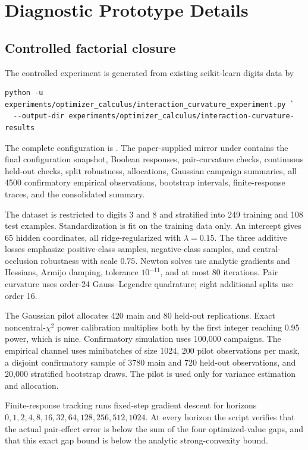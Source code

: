 \section{Diagnostic Prototype Details}
\label{app:diagnostic-details}

\subsection{Controlled factorial closure}

The controlled experiment is generated from existing scikit-learn digits data
by
\begin{verbatim}
python -u experiments/optimizer_calculus/interaction_curvature_experiment.py `
  --output-dir experiments/optimizer_calculus/interaction-curvature-results
\end{verbatim}
The complete configuration is
.
The paper-supplied mirror under  contains
the final configuration snapshot, Boolean responses, pair-curvature checks,
continuous held-out checks, split robustness, allocations, Gaussian campaign
summaries, all 4500 confirmatory empirical observations, bootstrap intervals,
finite-response traces, and the consolidated summary.

The dataset is restricted to digits 3 and 8 and stratified into 249 training
and 108 test examples.  Standardization is fit on the training data only.  An
intercept gives 65 hidden coordinates, all ridge-regularized with
$\lambda=0.15$.  The three additive losses emphasize positive-class samples,
negative-class samples, and central-occlusion robustness with scale $0.75$.
Newton solves use analytic gradients and Hessians, Armijo damping, tolerance
$10^{-11}$, and at most 80 iterations.  Pair curvature uses order-24
Gauss--Legendre quadrature; eight additional splits use order 16.

The Gaussian pilot allocates 420 main and 80 held-out replications.  Exact
noncentral-$\chi^2$ power calibration multiplies both by the first integer
reaching 0.95 power, which is nine.  Confirmatory simulation uses 100,000
campaigns.  The empirical channel uses minibatches of size 1024, 200 pilot
observations per mask, a disjoint confirmatory sample of 3780 main and 720
held-out observations, and 20,000 stratified bootstrap draws.  The pilot is
used only for variance estimation and allocation.

Finite-response tracking runs fixed-step gradient descent for horizons
$0,1,2,4,8,16,32,64,128,256,512,1024$.  At every horizon the script verifies
that the actual pair-effect error is below the sum of the four optimized-value
gaps, and that this exact gap bound is below the analytic strong-convexity
bound.

